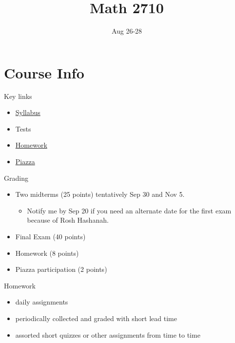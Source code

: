 \documentclass[ignorenonframetext,]{beamer}
\title{Math 2710}
\author{Aug 26-28}
\date{}
\providecommand{\tightlist}{%
  \setlength{\itemsep}{0pt}\setlength{\parskip}{0pt}}
\begin{document}
\frame{\titlepage}

\hypertarget{course-info}{%
\section{Course Info}\label{course-info}}

\begin{frame}{Key links}
\protect\hypertarget{key-links}{}

\begin{itemize}
\tightlist
\item
  \href{https://learn.uconn.edu/bbcswebdav/courses/M1198-MATH-2710-001.002/syllabus.pdf}{Syllabus}
\item
  Tests
\item
  \href{https://learn.uconn.edu/bbcswebdav/courses/M1198-MATH-2710-001.002/Homework.html}{Homework}
\item
  \href{https://piazza.com/uconn/fall2019/m1198math2710001002}{Piazza}
\end{itemize}

\end{frame}

\begin{frame}{Grading}
\protect\hypertarget{grading}{}

\begin{itemize}
\tightlist
\item
  Two midterms (25 points) tentatively Sep 30 and Nov 5.

  \begin{itemize}
  \tightlist
  \item
    Notify me by Sep 20 if you need an alternate date for the first exam
    because of Rosh Hashanah.
  \end{itemize}
\item
  Final Exam (40 points)
\item
  Homework (8 points)
\item
  Piazza participation (2 points)
\end{itemize}

\end{frame}

\begin{frame}{Homework}
\protect\hypertarget{homework}{}

\begin{itemize}
\tightlist
\item
  daily assignments
\item
  periodically collected and graded with short lead time
\item
  assorted short quizzes or other assignments from time to time
\end{itemize}

\end{frame}
\end{document}
